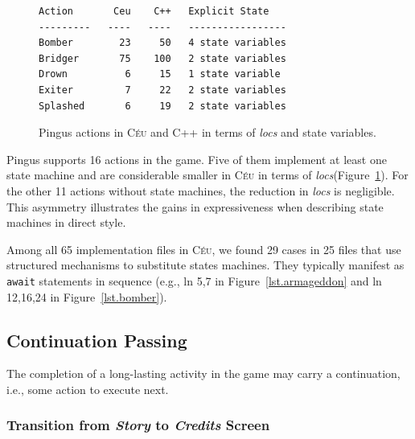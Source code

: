 \documentclass[times,twocolumn,final]{elsarticle}
\newcommand{\CEU}{\textsc{C\'{e}u}\xspace}
\newcommand{\locs}{\emph{locs}\xspace}
\newcommand{\code}[1] {{\small{\texttt{#1}}}}
\begin{document}
\begin{figure}
{\footnotesize
\begin{verbatim}
Action       Ceu    C++   Explicit State
---------   ----   ----   -----------------
Bomber        23     50   4 state variables
Bridger       75    100   2 state variables
Drown          6     15   1 state variable
Exiter         7     22   2 state variables
Splashed       6     19   2 state variables
\end{verbatim}
\caption{Pingus actions in \CEU and C++ in terms of \locs and state variables.
\label{tab.actions}
}
}
\end{figure}

Pingus supports 16 actions in the game.
Five of them implement at least one state machine and are considerable smaller
in \CEU in terms of \locs (Figure~\ref{tab.actions}).
%
For the other 11 actions without state machines, the reduction in \locs is
negligible.
%
This asymmetry illustrates the gains in expressiveness when describing state
machines in direct style.


Among all 65 implementation files in \CEU, we found 29 cases in 25 files that
use structured mechanisms to substitute states machines.
They typically manifest as \code{await} statements in sequence (e.g.,
ln 5,7 in Figure~\ref{lst.armageddon} and ln 12,16,24 in
Figure~\ref{lst.bomber}).

\subsection{Continuation Passing}
\label{sec.pats.cps}

    The completion of a long-lasting activity in the game may carry a
    continuation, i.e., some action to execute next.

\subsubsection{ Transition from \emph{Story}  to \emph{Credits} Screen}
\end{document}
